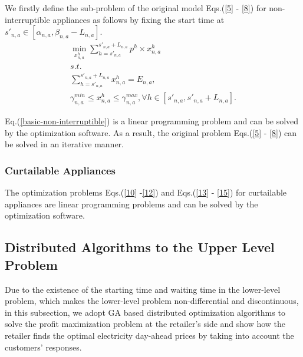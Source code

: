 \documentclass[10pt,journal]{IEEEtran}
\theoremstyle{definition}
\theoremstyle{plain} \newtheorem{theo}{Theorem} \newtheorem{prop}{Proposition}  \newtheorem{lemm}{Lemma}
\begin{document}
We firstly define the sub-problem of the original model Eqs.(\ref{5} - \ref{8}) for non-interruptible appliances as follows by fixing the start time at $s'_{n,a} \in [\alpha_{n,a}, \beta_{n,a} - L_{n,a}]$.
\begin{equation} \label{basic-non-interruptible}
\begin{array}{l} 
   \underset{x_{n,a}^h} {\operatorname{\min}} \sum_{h=s'_{n,a}}^{s'_{n,a}+ L_{n,a}}  p^h \times  x_{n,a}^h\\
    s.t. \\
    
 \sum_{h=s'_{n,a}}^{s'_{n,a}+ L_{n,a}} x_{n,a}^h=E_{n,a},\\
 
 \gamma_{n,a}^{min}\leq x_{n,a}^h \leq \gamma_{n,a}^{max}, \forall h \in [s'_{n,a}, s'_{n,a}+ L_{n,a}].
 \end{array}
 \end{equation}

Eq.(\ref{basic-non-interruptible}) is a linear programming problem and can be solved by the optimization software. As a result, the original problem Eqs.(\ref{5} - \ref{8}) can be solved in an iterative manner. 

\subsubsection{Curtailable Appliances}

The optimization problems Eqs.(\ref{10} -\ref{12}) and Eqs.(\ref{13} - \ref{15}) for curtailable appliances are linear programming problems and can be solved by the optimization software. 








\subsection{Distributed Algorithms to the Upper Level Problem}

Due to the existence of the starting time and waiting time in the lower-level problem, which makes the lower-level problem non-differential and  discontinuous, in this subsection, we adopt GA based distributed optimization algorithms to solve the profit maximization problem at the retailer's side and show how the retailer finds the optimal electricity day-ahead prices by taking into account the customers' responses. 
\end{document}
